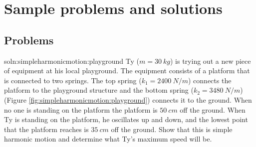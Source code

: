 \newpage
\section{Sample problems and solutions}
\subsection{Problems}
\begin{problem}{soln:simpleharmonicmotion:playground}{\label{prob:simpleharmonicmotion:playground} Ty ($m=\SI{30}{kg}$) is trying out a new piece of equipment at his local playground. The equipment consists of a platform that is connected to two springs. The top spring ($k_1=\SI{2400}{N/m}$) connects the platform to the playground structure and the bottom spring ($k_2=\SI{3480}{N/m}$) (Figure \ref{fig:simpleharmonicmotion:playground}) connects it to the ground. When no one is standing on the platform the platform is $\SI{50}{cm}$ off the ground. When Ty is standing on the platform, he oscillates up and down, and the lowest point that the platform reaches is $\SI{35}{cm}$ off the ground. Show that this is simple harmonic motion and determine what Ty's maximum speed will be.}
\end{problem}


